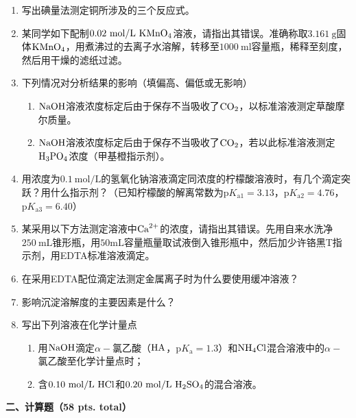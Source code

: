 \begin{enumerate}[label=\arabic*., itemsep=1.5ex]
    \item 写出碘量法测定铜所涉及的三个反应式。
    \item 某同学如下配制$0.02\ \mathrm{mol/L}\ \ce{KMnO4}$溶液，请指出其错误。准确称取$3.161\ \mathrm{g}$固体$\ce{KMnO4}$，用煮沸过的去离子水溶解，转移至$1000\ \mathrm{ml}$容量瓶，稀释至刻度，然后用干燥的滤纸过滤。
    \item 下列情况对分析结果的影响（填偏高、偏低或无影响）
    \begin{enumerate}[label=(\arabic*), noitemsep, topsep=0pt, partopsep=0pt]
        \item $\ce{NaOH}$溶液浓度标定后由于保存不当吸收了$\ce{CO2}$，以标准溶液测定草酸摩尔质量。
        \item $\ce{NaOH}$溶液浓度标定后由于保存不当吸收了$\ce{CO2}$，若以此标准溶液测定$\ce{H3PO4}$浓度（甲基橙指示剂）。
    \end{enumerate}
    \item 用浓度为$0.1\ \mathrm{mol/L}$的氢氧化钠溶液滴定同浓度的柠檬酸溶液时，有几个滴定突跃？用什么指示剂？（已知柠檬酸的解离常数为$\mathrm{p}K_{\mathrm{a1}}=3.13$，$\mathrm{p}K_{\mathrm{a2}}=4.76$，$\mathrm{p}K_{\mathrm{a3}}=6.40$）
    \item 某采用以下方法测定溶液中$\ce{Ca^{2+}}$的浓度，请指出其错误。先用自来水洗净$250\ \mathrm{mL}$锥形瓶，用$50\mathrm{mL}$容量瓶量取试液倒入锥形瓶中，然后加少许铬黑T指示剂，用EDTA标准溶液滴定。
    \item 在采用EDTA配位滴定法测定金属离子时为什么要使用缓冲溶液？
    \item 影响沉淀溶解度的主要因素是什么？
    \item 写出下列溶液在化学计量点
    \begin{enumerate}[label=(\arabic*), noitemsep, topsep=0pt, partopsep=0pt]
        \item 用$\ce{NaOH}$滴定$\alpha-$氯乙酸（$\ce{HA}$，$\mathrm{p}K_\mathrm{a}=1.3$）和$\ce{NH4Cl}$混合溶液中的$\alpha-$氯乙酸至化学计量点时；
        \item 含$0.10\ \mathrm{mol/L}\ \ce{HCl}$和$0.20\ \mathrm{mol/L}\ \ce{H2SO4}$的混合溶液。
    \end{enumerate}
\end{enumerate}

\vspace{0.5cm}
\noindent\textbf{二、计算题（58 pts. total）}

